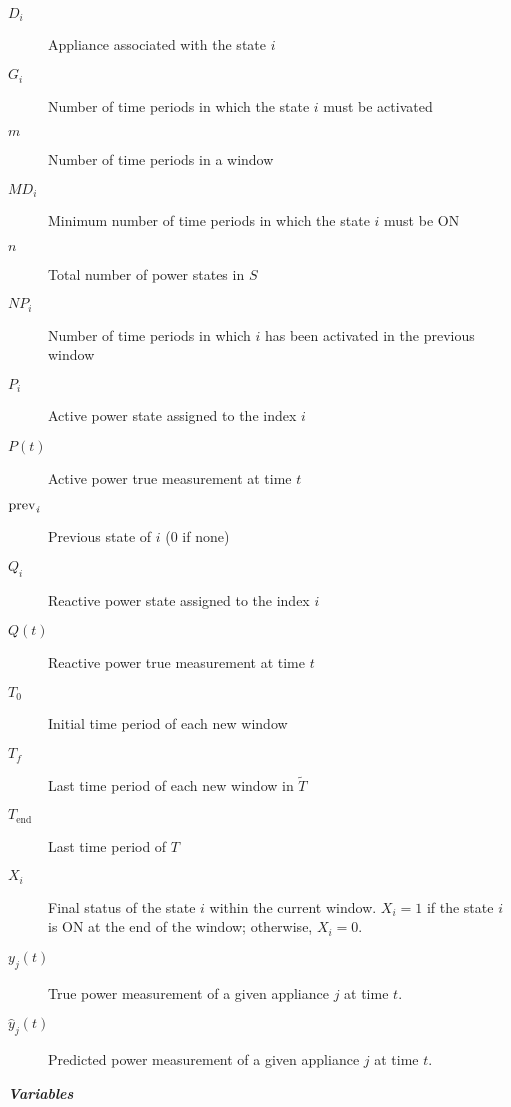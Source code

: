 \begin{description}

    \item [{$D_i$}]     Appliance associated with the state $i$
    \item [{$G_i$}]     Number of time periods in which the state $i$ must be activated
    \item [{$m$}]       Number of time periods in a window
    \item [{$MD_i$}]    Minimum number of time periods in which the state $i$ must be ON
    \item [{$n$}]       Total number of power states in $S$
    \item [{$NP_i$}]    Number of time periods in which $i$ has been activated in the previous window
    \item [{$P_i$}]     Active power state assigned to the index $i$
    \item [{$P(t)$}]    Active power true measurement at time $t$
    \item [{$\rm{prev}_\textit{i}$}]Previous state of $i$ (0 if none)
    \item [{$Q_i$}]     Reactive power state assigned to the index $i$
    \item [{$Q(t)$}]    Reactive power true measurement at time $t$
    \item [{$T_0$}]     Initial time period of each new window
    \item [{$T_f$}]     Last time period of each new window in $\tilde{T}$
    \item [{$T_{\text{end}}$}] Last time period of $T$ 
    \item [{$X_i$}]     Final status of the state $i$ within the current window. $X_i=1$ if the state $i$ is ON at the end of the window; otherwise, $X_i=0$.

    \item [{$y_j(t)$}]     True power measurement of a given appliance $j$ at time $t$.
    \item [{$\hat{y}_j(t)$}]     Predicted power measurement of a given appliance $j$ at time $t$.

\end{description}

\vspace{4pt}

\noindent \emph{\textbf{Variables}}

\vspace{4pt}

